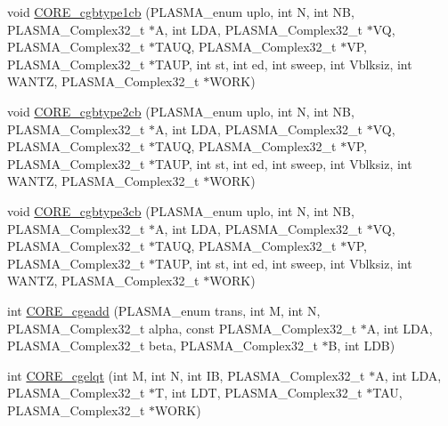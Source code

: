 \begin{DoxyCompactItemize}
void \hyperlink{group__CORE__PLASMA__Complex32__t_gaeac8b9c395c5b6c4e00ceb7b5160ea08_gaeac8b9c395c5b6c4e00ceb7b5160ea08}{C\+O\+R\+E\+\_\+cgbtype1cb} (P\+L\+A\+S\+M\+A\+\_\+enum uplo, int N, int N\+B, P\+L\+A\+S\+M\+A\+\_\+\+Complex32\+\_\+t $\ast$A, int L\+D\+A, P\+L\+A\+S\+M\+A\+\_\+\+Complex32\+\_\+t $\ast$V\+Q, P\+L\+A\+S\+M\+A\+\_\+\+Complex32\+\_\+t $\ast$T\+A\+U\+Q, P\+L\+A\+S\+M\+A\+\_\+\+Complex32\+\_\+t $\ast$V\+P, P\+L\+A\+S\+M\+A\+\_\+\+Complex32\+\_\+t $\ast$T\+A\+U\+P, int st, int ed, int sweep, int Vblksiz, int W\+A\+N\+T\+Z, P\+L\+A\+S\+M\+A\+\_\+\+Complex32\+\_\+t $\ast$W\+O\+R\+K)
\item 
void \hyperlink{group__CORE__PLASMA__Complex32__t_gab49cc5835213ad5ef256ea8087c9f589_gab49cc5835213ad5ef256ea8087c9f589}{C\+O\+R\+E\+\_\+cgbtype2cb} (P\+L\+A\+S\+M\+A\+\_\+enum uplo, int N, int N\+B, P\+L\+A\+S\+M\+A\+\_\+\+Complex32\+\_\+t $\ast$A, int L\+D\+A, P\+L\+A\+S\+M\+A\+\_\+\+Complex32\+\_\+t $\ast$V\+Q, P\+L\+A\+S\+M\+A\+\_\+\+Complex32\+\_\+t $\ast$T\+A\+U\+Q, P\+L\+A\+S\+M\+A\+\_\+\+Complex32\+\_\+t $\ast$V\+P, P\+L\+A\+S\+M\+A\+\_\+\+Complex32\+\_\+t $\ast$T\+A\+U\+P, int st, int ed, int sweep, int Vblksiz, int W\+A\+N\+T\+Z, P\+L\+A\+S\+M\+A\+\_\+\+Complex32\+\_\+t $\ast$W\+O\+R\+K)
\item 
void \hyperlink{group__CORE__PLASMA__Complex32__t_ga5d3e35aade213d33733843e608fdda37_ga5d3e35aade213d33733843e608fdda37}{C\+O\+R\+E\+\_\+cgbtype3cb} (P\+L\+A\+S\+M\+A\+\_\+enum uplo, int N, int N\+B, P\+L\+A\+S\+M\+A\+\_\+\+Complex32\+\_\+t $\ast$A, int L\+D\+A, P\+L\+A\+S\+M\+A\+\_\+\+Complex32\+\_\+t $\ast$V\+Q, P\+L\+A\+S\+M\+A\+\_\+\+Complex32\+\_\+t $\ast$T\+A\+U\+Q, P\+L\+A\+S\+M\+A\+\_\+\+Complex32\+\_\+t $\ast$V\+P, P\+L\+A\+S\+M\+A\+\_\+\+Complex32\+\_\+t $\ast$T\+A\+U\+P, int st, int ed, int sweep, int Vblksiz, int W\+A\+N\+T\+Z, P\+L\+A\+S\+M\+A\+\_\+\+Complex32\+\_\+t $\ast$W\+O\+R\+K)
\item 
int \hyperlink{group__CORE__PLASMA__Complex32__t_ga09e552315ef6f7d23be4dbfdc405b132_ga09e552315ef6f7d23be4dbfdc405b132}{C\+O\+R\+E\+\_\+cgeadd} (P\+L\+A\+S\+M\+A\+\_\+enum trans, int M, int N, P\+L\+A\+S\+M\+A\+\_\+\+Complex32\+\_\+t alpha, const P\+L\+A\+S\+M\+A\+\_\+\+Complex32\+\_\+t $\ast$A, int L\+D\+A, P\+L\+A\+S\+M\+A\+\_\+\+Complex32\+\_\+t beta, P\+L\+A\+S\+M\+A\+\_\+\+Complex32\+\_\+t $\ast$B, int L\+D\+B)
\item 
int \hyperlink{group__CORE__PLASMA__Complex32__t_ga3882801d5cbff5f623def8ecd0632f4f_ga3882801d5cbff5f623def8ecd0632f4f}{C\+O\+R\+E\+\_\+cgelqt} (int M, int N, int I\+B, P\+L\+A\+S\+M\+A\+\_\+\+Complex32\+\_\+t $\ast$A, int L\+D\+A, P\+L\+A\+S\+M\+A\+\_\+\+Complex32\+\_\+t $\ast$T, int L\+D\+T, P\+L\+A\+S\+M\+A\+\_\+\+Complex32\+\_\+t $\ast$T\+A\+U, P\+L\+A\+S\+M\+A\+\_\+\+Complex32\+\_\+t $\ast$W\+O\+R\+K)

\end{DoxyCompactItemize}
